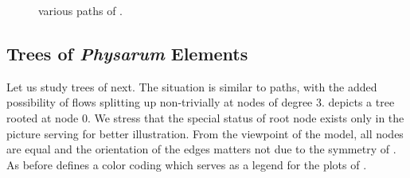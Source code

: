 		\begin{figure}
			\centering
			\qquad
			\newline
			\qquad
			\newline
			\qquad
			\newline
			\qquad
			
			\caption[Path simulations]{various paths of \Pes.}
			\label{fig:paths}
		\end{figure}



	\subsection{Trees of \emph{Physarum} Elements}
		
		Let us study trees of \Pes next. The situation is similar to paths, with the added possibility of flows splitting up non-trivially at nodes of degree $3$.  depicts a tree rooted at node $0$. We stress that the special status of root node exists only in the picture serving for better illustration. From the viewpoint of the model, all nodes are equal and the orientation of the edges matters not due to the symmetry of \Pes. As before  defines a color coding which serves as a legend for the plots of .

